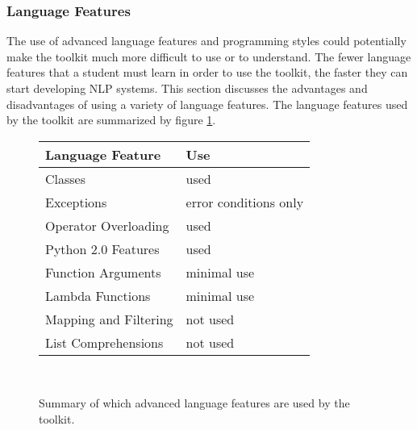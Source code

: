 \documentclass{article}
\begin{document}
\subsubsection{Language Features}

The use of advanced language features and programming styles could
potentially make the toolkit much more difficult to use or to
understand.  The fewer language features that a student must learn in
order to use the toolkit, the faster they can start developing NLP
systems.  This section discusses the advantages and disadvantages of
using a variety of language features.  The language features used by
the toolkit are summarized by figure \ref{table:feature}.

\begin{figure}
\begin{centering}
\begin{tabular}{|l|l|}
\hline
\textbf{Language Feature} & \textbf{Use} \\
\hline
Classes & used \\
Exceptions & error conditions only \\
Operator Overloading & used \\
Python 2.0 Features & used \\
Function Arguments & minimal use \\
Lambda Functions & minimal use \\
Mapping and Filtering & not used \\
List Comprehensions & not used \\
\hline
\end{tabular}\\
\end{centering}
\caption{Summary of which advanced language features are used by the
toolkit.}
\label{table:feature}
\end{figure}
\end{document}
